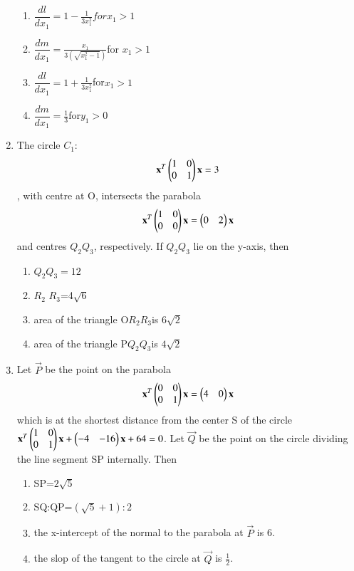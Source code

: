 \documentclass[journal,12pt,twocolumn]{IEEEtran}
\begin{document}
\begin{enumerate}[label=\arabic*]
    \begin{enumerate}
    \item $\dfrac{dl}{dx_1}=1-\frac{1}{3x_1^2}for x_1>1$
    \item $\dfrac{dm}{dx_1}=\frac{x_1}{3(\sqrt{x_1^2-1})}$for $x_1>1$
    \item $\dfrac{dl}{dx_1}=1+\frac{1}{3x_1^2}$for$ x_1>1$
    \item $\dfrac{dm}{dx_1}=\frac{1}{3}$for$y_1>0$
    \end{enumerate}
    \item The circle $C_1$:
    \begin{align}
    \mathbf{x}^T \begin{pmatrix}1& 0 \\0 & 1 \end{pmatrix} \mathbf{x}=3
    \end{align}, with centre at O, intersects the parabola 
    \begin{align}
    \mathbf{x}^T \begin{pmatrix}1& 0 \\0 & 0\end{pmatrix} \mathbf{x}=\begin{pmatrix}0&2\end{pmatrix}\mathbf{x}
    \end{align} and centres $Q_2 Q_3$, respectively. If $Q_2 Q_3$ lie on the y-axis, then
    \begin{enumerate}
    \item $Q_2 Q_3=12$
    \item $R_2$ $R_3$=4$\sqrt{6}$
    \item area of the triangle O$R_2R_3$is $6\sqrt{2}$
    \item area of the triangle P$Q_2Q_3$is $4\sqrt{2}$
    \end{enumerate}
    \item Let $\vec{P}$ be the point on the parabola
    \begin{align}
    \mathbf{x}^T\begin{pmatrix}0&0\\0&1\end{pmatrix}\mathbf{x}=\begin{pmatrix}4&0\end{pmatrix}\mathbf{x}
    \end{align} which is at the shortest distance from the center S of the circle $\mathbf{x}^T\begin{pmatrix}1&0\\0&1\end{pmatrix}\mathbf{x}+\begin{pmatrix}-4&-16\end{pmatrix} \mathbf{x}+64=0$. Let $\vec{Q}$ be the point on the circle dividing the line segment SP internally. Then 
    \begin{enumerate}
    \item SP=$2\sqrt{5}$
    \item SQ:QP=$(\sqrt5+1):2$
    \item the x-intercept of the normal to the parabola at $\vec{P}$ is 6.
    \item the slop of the tangent to the circle at $\vec{Q}$ is $\frac{1}{2}$.
    \end{enumerate}

\end{enumerate}
\end{document}
